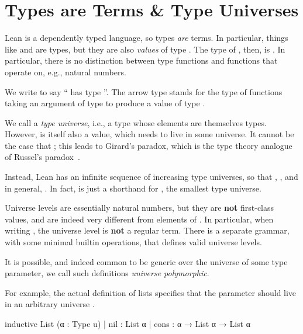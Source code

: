 \section{Types are Terms \& Type Universes}
Lean is a dependently typed language, so types \emph{are} terms. 
In particular, things like  and  are types, but they are also \emph{values} of type \Type{}.
The type of , then, is .
In particular, there is no distinction between type functions and functions that operate on, e.g., natural numbers.


\begin{remark}
    We write  to say `` has type ''.
    The arrow type  stands for the type of functions taking an argument of type 
    to produce a value of type .
\end{remark}

We call \Type{} a \emph{type universe}, i.e., a type whose elements are themselves types. However, \Type{} is itself also a value, which needs to live in some universe.
It cannot be the case that ; this leads to Girard's paradox, which is the type theory analogue of Russel's paradox~\cite{girardInterpretationFonctionelleElimination1972}.

Instead, Lean has an infinite sequence of increasing type universes, so that , , and in general, . In fact,  is just a shorthand for , the smallest type universe.

Universe levels  are essentially natural numbers, but they are \textbf{not} first-class values, and are indeed very different from elements of .
In particular, when writing , the universe level  is \textbf{not} a regular term. There is a separate grammar, with some minimal builtin operations, that defines valid universe levels.

It is possible, and indeed common to be generic over the universe of some type parameter, we call such 
definitions \emph{universe polymorphic}.

For example, the actual definition of lists specifies that the parameter  should live in an arbitrary universe .
\begin{leancode}
  inductive List (α : Type u)
    | nil  : List α
    | cons : α → List α → List α
\end{leancode}

